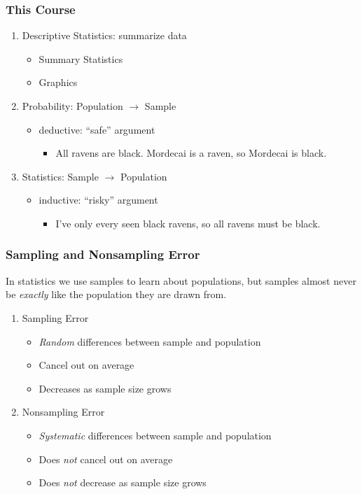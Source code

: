 \documentclass[handout]{beamer}
\begin{document}
\begin{frame}

\frametitle{This Course}

\begin{enumerate}
	\item Descriptive Statistics: summarize data
		\begin{itemize}
			\item Summary Statistics
			\item Graphics
		\end{itemize}
	\item Probability: Population $\rightarrow$ Sample
		\begin{itemize}
			\item deductive: ``safe'' argument
				\begin{itemize}
					\item All ravens are black. Mordecai is a raven, so Mordecai is black.
				\end{itemize}
		\end{itemize}
	\item Statistics: Sample $\rightarrow$ Population
		\begin{itemize}
			\item inductive: ``risky'' argument
				\begin{itemize}
					\item I've only every seen black ravens, so all ravens must be black.
				\end{itemize}
		 \end{itemize}
\end{enumerate}


\end{frame}
\begin{frame}
\frametitle{Sampling and Nonsampling Error}
In statistics we use samples to learn about populations, but samples almost never be \emph{exactly} like the population they are drawn from.
	\begin{enumerate}
		\item Sampling Error 
			\begin{itemize}
				\item \emph{Random} differences between sample and population
				\item Cancel out on average
				\item Decreases as sample size grows
			\end{itemize}
		\item Nonsampling Error
			\begin{itemize}
				\item \emph{Systematic} differences between sample and population 
				\item Does \emph{not} cancel out on average
				\item Does \emph{not} decrease as sample size grows
			\end{itemize}
	\end{enumerate}
\end{frame}
\end{document}
